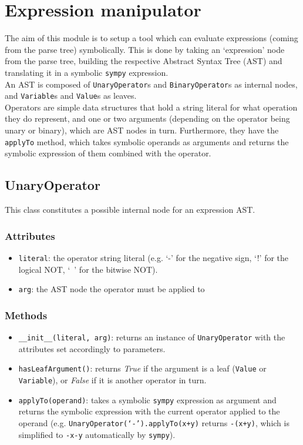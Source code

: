 \documentclass[12pt,a4paper]{report}
\theoremstyle{definition}
\theoremstyle{definition}
\theoremstyle{definition}
\begin{document}
\section{Expression manipulator}
The aim of this module is to setup a tool which can evaluate expressions (coming from the parse tree) symbolically. This is done by taking an `expression' node from the parse tree, building the respective Abstract Syntax Tree (AST) and translating it in a symbolic \texttt{sympy} expression.\\
An AST is composed of \texttt{UnaryOperator}s and \texttt{BinaryOperator}s as internal nodes, and \texttt{Variable}s and \texttt{Value}s as leaves.\\
Operators are simple data structures that hold a string literal for what operation they do represent, and one or two arguments (depending on the operator being unary or binary), which are AST nodes in turn. Furthermore, they have the \texttt{applyTo} method, which takes symbolic operands as arguments and returns the symbolic expression of them combined with the operator.\\
\subsection{UnaryOperator}
This class constitutes a possible internal node for an expression AST.
\subsubsection{Attributes}
\begin{itemize}
    \itemsep 0em
    \item \texttt{literal}: the operator string literal (e.g. `-' for the negative sign, `!' for the logical NOT, `~' for the bitwise NOT).
    \item \texttt{arg}: the AST node the operator must be applied to
\end{itemize}
\subsubsection{Methods}
\begin{itemize}
    \itemsep 0em
    \item \texttt{\_\_init\_\_(literal, arg)}: returns an instance of \texttt{UnaryOperator} with the attributes set accordingly to parameters.
    \item \texttt{hasLeafArgument()}: returns \textit{True} if the argument is a leaf (\texttt{Value} or \texttt{Variable}), or \textit{False} if it is another operator in turn.
    \item \texttt{applyTo(operand)}: takes a symbolic \texttt{sympy} expression as argument and returns the symbolic expression with the current operator applied to the operand (e.g. \texttt{UnaryOperator(`-').applyTo(x+y)} returns \texttt{-(x+y)}, which is simplified to \texttt{-x-y} automatically by \texttt{sympy}).
\end{itemize}
\end{document}
